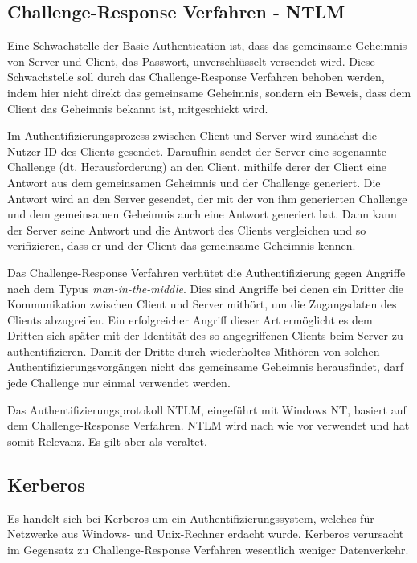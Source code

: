 \subsection{Challenge-Response Verfahren - NTLM}
\label{cha:WS_AUTH_ChalResp}
Eine Schwachstelle der Basic Authentication ist, dass das gemeinsame Geheimnis von Server und Client, das Passwort, unverschlüsselt versendet wird. Diese Schwachstelle soll durch das Challenge-Response Verfahren behoben werden, indem hier nicht direkt das gemeinsame Geheimnis, sondern ein Beweis, dass dem Client das Geheimnis bekannt ist, mitgeschickt wird. \cite[S. 56-57]{Prohl.2011}

Im Authentifizierungsprozess zwischen Client und Server wird zunächst die Nutzer-ID des Clients gesendet. Daraufhin sendet der Server eine sogenannte Challenge (dt. Herausforderung) an den Client, mithilfe derer der Client eine Antwort aus dem gemeinsamen Geheimnis und der Challenge generiert. Die Antwort wird an den Server gesendet, der mit der von ihm generierten Challenge und dem gemeinsamen Geheimnis auch eine Antwort generiert hat. Dann kann der Server seine Antwort und die Antwort des Clients vergleichen und so verifizieren, dass er und der Client das gemeinsame Geheimnis kennen. \cite[S. 57-58]{Prohl.2011}

Das Challenge-Response Verfahren verhütet die Authentifizierung gegen Angriffe nach dem Typus \emph{man-in-the-middle}. Dies sind Angriffe bei denen ein Dritter die Kommunikation zwischen Client und Server mithört, um die Zugangsdaten des Clients abzugreifen. Ein erfolgreicher Angriff dieser Art ermöglicht es dem Dritten sich später mit der Identität des so angegriffenen Clients beim Server zu authentifizieren. \cite[S. 413]{Eckert.2009} Damit der Dritte durch wiederholtes Mithören von solchen Authentifizierungsvorgängen nicht das gemeinsame Geheimnis herausfindet, darf jede Challenge nur einmal verwendet werden. \cite[S. 59]{Prohl.2011}

Das Authentifizierungsprotokoll \ac{NTLM}, eingeführt mit Windows NT, basiert auf dem Challenge-Response Verfahren. \cite{Durlanik.2005} \ac{NTLM} wird nach wie vor verwendet und hat somit Relevanz. Es gilt aber als veraltet. \cite[S. 975-976]{Boddenberg.2014}

\subsection{Kerberos}
\label{cha:WS_AUTH_Kerberos}
Es handelt sich bei Kerberos um ein Authentifizierungssystem, welches für Netzwerke aus Windows- und Unix-Rechner erdacht wurde. \cite[S. 70]{Boer.2011} Kerberos verursacht im Gegensatz zu Challenge-Response Verfahren wesentlich weniger Datenverkehr. \cite[S. 59]{Prohl.2011}

